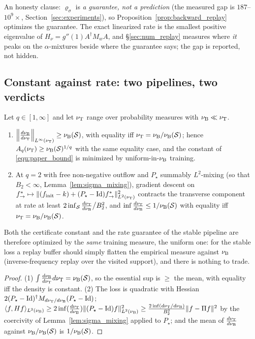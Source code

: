 An honesty clause: $\varrho_\sigma$ is \emph{a guarantee, not a
prediction} (the measured gap is $187$--$10^9\times$, Section~\ref{sec:experiments}), so
Proposition~\ref{prop:backward_replay} optimizes the guarantee. The exact linearized rate
is the smallest positive eigenvalue of $H_\nu=g''(1)A^\dagger M_wA$, and
\S\ref{sec:num_replay} measures where \emph{it} peaks on the $\alpha$-mixtures beside
where the guarantee says; the gap is reported, not hidden.

\subsection{Constant against rate: two pipelines, two verdicts}\label{sec:tension}

\begin{proposition}\label{prop:stable_uniform}
Let $q\in[1,\infty]$ and let $\nu_{\mathrm{T}}$ range over probability measures with
$\nu_{\mathrm{B}}\ll\nu_{\mathrm{T}}$.
\begin{enumerate}
    \item $\left\|\frac{d\nu_{\mathrm{B}}}{d\nu_{\mathrm{T}}}\right\|_{L^\infty(\nu_{\mathrm{T}})}\geq\nu_{\mathrm{B}}(\mathcal S)$,
    with equality iff $\nu_{\mathrm{T}}=\nu_{\mathrm{B}}/\nu_{\mathrm{B}}(\mathcal S)$; hence
    $A_q(\nu_{\mathrm{T}})\geq\nu_{\mathrm{B}}(\mathcal S)^{1/q}$ with the same equality case, and the
    constant of \eqref{equ:paper_bound} is minimized by uniform-in-$\nu_{\mathrm{B}}$ training.
    \item At $q=2$ with free non-negative outflow and $P_\star$ summably $L^2$-mixing
    (so that $B_2<\infty$, Lemma~\ref{lem:sigma_mixing}), gradient descent on
    $f^*_{\rightarrow}\mapsto\|(f_{\mathrm{init}}-k)+(P_\star-\mathrm{Id})f^*_{\rightarrow}\|^2_{L^2(\nu_{\mathrm{T}})}$
    contracts the transverse component at rate at least
    $2\inf_\mathcal S\frac{d\nu_{\mathrm{T}}}{d\nu_{\mathrm{B}}}\big/B_2^2$, and
    $\inf\frac{d\nu_{\mathrm{T}}}{d\nu_{\mathrm{B}}}\leq1/\nu_{\mathrm{B}}(\mathcal S)$ with equality iff
    $\nu_{\mathrm{T}}=\nu_{\mathrm{B}}/\nu_{\mathrm{B}}(\mathcal S)$.
\end{enumerate}
Both the certificate constant and the rate guarantee of the stable pipeline are therefore
optimized by the \emph{same} training measure, the uniform one: for the stable loss a
replay buffer should simply flatten the empirical measure against $\nu_{\mathrm{B}}$
(inverse-frequency replay over the visited support), and there is nothing to trade.
\end{proposition}

\begin{proof}
(1) $\int\frac{d\nu_{\mathrm{B}}}{d\nu_{\mathrm{T}}}{}d\nu_{\mathrm{T}}=\nu_{\mathrm{B}}(\mathcal S)$, so the essential sup
is $\geq$ the mean, with equality iff the density is constant.
(2) The loss is quadratic with Hessian $2(P_\star-\mathrm{Id})^\dagger
M_{d\nu_{\mathrm{T}}/d\nu_{\mathrm{B}}}(P_\star-\mathrm{Id})$;
$\langle f,Hf\rangle_{L^2(\nu_{\mathrm{B}})}\geq2\inf(\tfrac{d\nu_{\mathrm{T}}}{d\nu_{\mathrm{B}}})\|(P_\star-\mathrm{Id})f\|^2_{L^2(\nu_{\mathrm{B}})}
\geq\frac{2\inf(d\nu_{\mathrm{T}}/d\nu_{\mathrm{B}})}{B_2^2}\|f-\Pi f\|^2$ by the coercivity of
Lemma~\ref{lem:sigma_mixing} applied to $P_\star$; and the mean of
$\frac{d\nu_{\mathrm{T}}}{d\nu_{\mathrm{B}}}$ against $\nu_{\mathrm{B}}/\nu_{\mathrm{B}}(\mathcal S)$ is
$1/\nu_{\mathrm{B}}(\mathcal S)$.
\end{proof}

